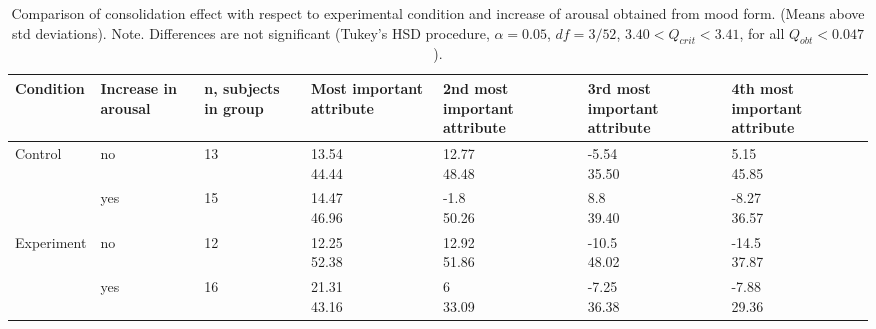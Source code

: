 



\begin{table*}
  \centering
  \small
  \begingroup
    \begin{tabularx}{\textwidth}{XXXXXXX}
      \toprule

      Condition
      & Increase in arousal
      & n, subjects in group
      & Most important attribute
      & 2nd most important attribute
      & 3rd most important attribute
      & 4th most important attribute
      \\

      \midrule


      Control
      & no
      & 13
      & \cellcontent{13.54\\44.44}
      & \cellcontent{12.77\\48.48}
      & \cellcontent{-5.54\\35.50}
      & \cellcontent{5.15\\45.85}
      \\

      & yes
      & 15
      & \cellcontent{14.47\\46.96}
      & \cellcontent{-1.8\\50.26}
      & \cellcontent{8.8\\39.40}
      & \cellcontent{-8.27\\36.57}
      \\

      Experiment
      & no
      & 12
      & \cellcontent{12.25\\52.38}
      & \cellcontent{12.92\\51.86}
      & \cellcontent{-10.5\\48.02}
      & \cellcontent{-14.5\\37.87}
      \\

      & yes
      & 16
      & \cellcontent{21.31\\43.16}
      & \cellcontent{6\\33.09}
      & \cellcontent{-7.25\\36.38}
      & \cellcontent{-7.88\\29.36}
      \\

      \bottomrule
    \end{tabularx}
    \endgroup
  \caption{Comparison of consolidation effect with respect to
    experimental condition and increase of arousal obtained from mood
    form. (Means above std deviations). Note. Differences are not
    significant (Tukey's HSD procedure, $\alpha=0.05$, $df = 3/52$,
    $3.40 < Q_{crit} < 3.41$, for all $Q_{obt}<0.047$).\label{tab:arousal}}
\end{table*}



